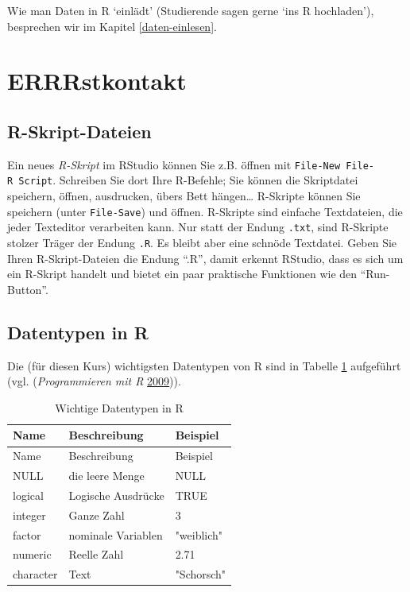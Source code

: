 \documentclass[12pt,ngerman,]{book}
\theoremstyle{definition}
\theoremstyle{definition}
\theoremstyle{remark}
\begin{document}
Wie man Daten in R `einlädt' (Studierende sagen gerne `ins R
hochladen'), besprechen wir im Kapitel \ref{daten-einlesen}.

\section{ERRRstkontakt}\label{errrstkontakt}

\subsection{R-Skript-Dateien}\label{r-skript-dateien}

Ein neues \emph{R-Skript} im RStudio können Sie z.B.
öffnen mit \texttt{File-New\ File-R\ Script}. Schreiben Sie dort Ihre
R-Befehle; Sie können die Skriptdatei speichern, öffnen, ausdrucken,
übers Bett hängen\ldots{} R-Skripte können Sie speichern (unter
\texttt{File-Save}) und öffnen. R-Skripte sind einfache Textdateien, die
jeder Texteditor verarbeiten kann. Nur statt der Endung \texttt{.txt},
sind R-Skripte stolzer Träger der Endung \texttt{.R}. Es bleibt aber
eine schnöde Textdatei. Geben Sie Ihren R-Skript-Dateien die Endung
``.R'', damit erkennt RStudio, dass es sich um ein R-Skript handelt und
bietet ein paar praktische Funktionen wie den ``Run-Button''.

\subsection{Datentypen in R}\label{datentypen-in-r}

Die (für diesen Kurs) wichtigsten Datentypen von R sind in Tabelle
\ref{tab:datentypen} aufgeführt (vgl. (\emph{Programmieren mit R}
\protect\hyperlink{ref-ligges}{2009})).

\begin{table}

\caption{\label{tab:datentypen}Wichtige Datentypen in R}
\centering
\begin{tabular}[t]{l|l|l}
\hline
Name & Beschreibung & Beispiel\\
\hline
Name & Beschreibung & Beispiel\\
\hline
NULL & die leere Menge & NULL\\
\hline
logical & Logische Ausdrücke & TRUE\\
\hline
integer & Ganze Zahl & 3\\
\hline
factor & nominale Variablen & "weiblich"\\
\hline
numeric & Reelle Zahl & 2.71\\
\hline
character & Text & "Schorsch"\\
\hline
\end{tabular}
\end{table}
\end{document}
